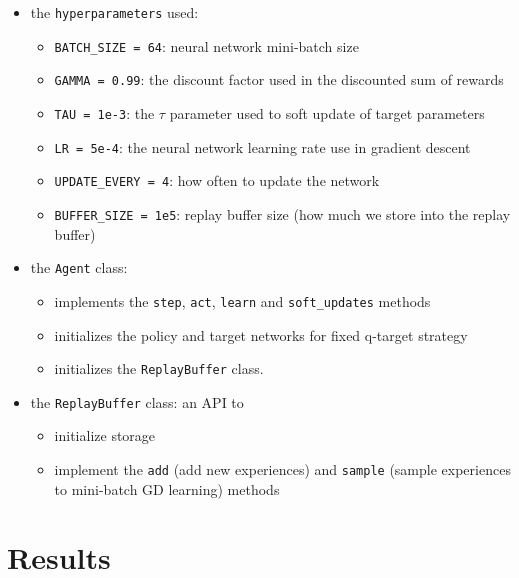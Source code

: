 \documentclass[
]{article}
\providecommand{\tightlist}{%
  \setlength{\itemsep}{0pt}\setlength{\parskip}{0pt}}
\begin{document}
\begin{itemize}
\tightlist
\item
  the \texttt{hyperparameters} used:

  \begin{itemize}
  \tightlist
  \item
    \texttt{BATCH\_SIZE\ =\ 64}: neural network mini-batch size
  \item
    \texttt{GAMMA\ =\ 0.99}: the discount factor used in the discounted
    sum of rewards
  \item
    \texttt{TAU\ =\ 1e-3}: the \(\tau\) parameter used to soft update of
    target parameters
  \item
    \texttt{LR\ =\ 5e-4}: the neural network learning rate use in
    gradient descent
  \item
    \texttt{UPDATE\_EVERY\ =\ 4}: how often to update the network
  \item
    \texttt{BUFFER\_SIZE\ =\ 1e5}: replay buffer size (how much we store
    into the replay buffer)
  \end{itemize}
\item
  the \texttt{Agent} class:

  \begin{itemize}
  \tightlist
  \item
    implements the \texttt{step}, \texttt{act}, \texttt{learn} and
    \texttt{soft\_updates} methods
  \item
    initializes the policy and target networks for fixed q-target
    strategy
  \item
    initializes the \texttt{ReplayBuffer} class.
  \end{itemize}
\item
  the \texttt{ReplayBuffer} class: an API to

  \begin{itemize}
  \tightlist
  \item
    initialize storage
  \item
    implement the \texttt{add} (add new experiences) and \texttt{sample}
    (sample experiences to mini-batch GD learning) methods
  \end{itemize}
\end{itemize}

\pagebreak

\hypertarget{results}{%
\section{Results}\label{results}}
\end{document}
